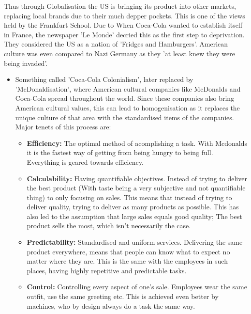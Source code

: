 \documentclass{article}
\begin{document}
	Thus through Globalisation the US is bringing its product into other markets, replacing local brands due to their much depper pockets. This is one of the views held by the Frankfurt School. Due to
	When Coca-Cola wanted to establish itself in France, the newspaper 'Le Monde' decried this as the first step to deprivation. They considered the US as a nation of 'Fridges and Hamburgers'. American culture was even compared to Nazi Germany as they 'at least knew they were being invaded'.
	\begin{itemize}
		\item{Something called 'Coca-Cola Colonialism', later replaced by 'McDonaldisation', where American cultural companies like McDonalds and Coca-Cola spread throughout the world. Since these companies also bring American cultural values, this can lead to homogenisation as it replaces the unique culture of that area with the standardised items of the companies. Major tenets of this process are:
		\begin{itemize}
			\item{\textbf{Efficiency:} The optimal method of acomplishing a task. With Mcdonalds it is the fastest way of getting from being hungry to being full. Everything is geared towards efficiency.}
			\item{\textbf{Calculability:} Having quantifiable objectives. Instead of trying to deliver the best product (With taste being a very subjective and not quantifiable thing) to only focusing on sales. This means that instead of trying to deliver quality, trying to deliver as many products as possible. This has also led to the assumption that large sales equals good quality; The best product sells the most, which isn't necessarily the case.}
		 	\item{\textbf{Predictability:} Standardised and uniform services. Delivering the same product everywhere, means that people can know what to expect no matter where they are. This is the same with the employees in such places, having highly repetitive and predictable tasks.}
		 	\item{\textbf{Control:} Controlling every aspect of one's sale. Employees wear the same outfit, use the same greeting etc. This is achieved even better by machines, who by design always do a task the same way.}
		 \end{itemize}}	
	\end{itemize}
\end{document}
